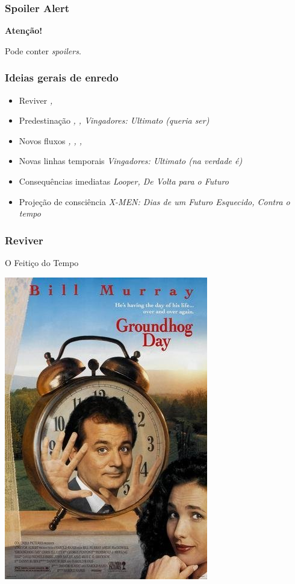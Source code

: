 \begin{frame}
    \frametitle{Spoiler Alert}

    \centering
    
    \alert{\Huge \bfseries Atenção!}
    
    {Pode conter {\em spoilers}.}
\end{frame}

\begin{frame}
    \frametitle{Ideias gerais de enredo}

    \begin{itemize}
        \item Reviver {\em , }
        \item Predestinação {\em , , Vingadores: Ultimato (queria ser)}
        \item Novos fluxos {\em , , , }
        \item Novas linhas temporais {\em Vingadores: Ultimato (na verdade é)}
        \item Consequências imediatas {\em Looper, De Volta para o Futuro}
        \item Projeção de consciência {\em X-MEN: Dias de um Futuro Esquecido, Contra o tempo}
    \end{itemize}
\end{frame}

\begin{frame}
    \frametitle{Reviver}
    
    \alert{O Feitiço do Tempo}

    \includegraphics[height=0.8\textheight]{img/posters/groundhog_day.jpg}
\end{frame}

